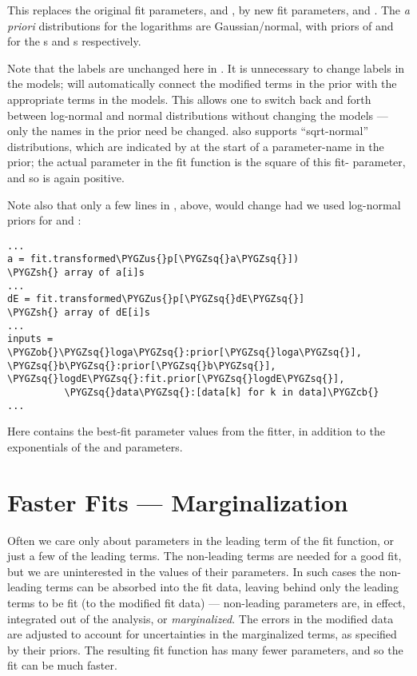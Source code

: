 \documentclass[letterpaper,10pt,english]{sphinxmanual}
\def\PYGZus{\char`\_}
\def\PYGZob{\char`\{}
\def\PYGZcb{\char`\}}
\def\PYGZsh{\char`\#}
\def\PYGZsq{\char`\'}
\begin{document}
This replaces the original fit parameters,  and , by new fit
parameters,  and . The \emph{a priori} distributions for
the logarithms are Gaussian/normal, with priors of  and
 for the s and s respectively.

Note that the labels are unchanged here in . It is
unnecessary to change labels in the models; {\hyperref[corrfitter:corrfitter.CorrFitter]{}} will automatically
connect the  modified terms in the prior with the appropriate terms in the
models. This allows one to switch back and forth between log-normal and normal
distributions without changing the models --- only the names in the prior
need be changed. {\hyperref[corrfitter:corrfitter.CorrFitter]{}} also supports ``sqrt-normal'' distributions,
which are indicated by  at the start of a parameter-name in the
prior; the actual parameter in the fit function is the square of this fit-
parameter, and so is again positive.

Note also that only a few lines in , above,
would change had we used log-normal priors for  and :

\begin{Verbatim}[commandchars=\\\{\}]
...
a = fit.transformed\PYGZus{}p[\PYGZsq{}a\PYGZsq{}])                 \PYGZsh{} array of a[i]s
...
dE = fit.transformed\PYGZus{}p[\PYGZsq{}dE\PYGZsq{}]                \PYGZsh{} array of dE[i]s
...
inputs = \PYGZob{}\PYGZsq{}loga\PYGZsq{}:prior[\PYGZsq{}loga\PYGZsq{}], \PYGZsq{}b\PYGZsq{}:prior[\PYGZsq{}b\PYGZsq{}], \PYGZsq{}logdE\PYGZsq{}:fit.prior[\PYGZsq{}logdE\PYGZsq{}],
          \PYGZsq{}data\PYGZsq{}:[data[k] for k in data]\PYGZcb{}
...
\end{Verbatim}

Here  contains the best-fit parameter values from the
fitter, in addition to the exponentials of the  and 
parameters.


\section{Faster Fits --- Marginalization}
\label{corrfitter:marginalized-fits}\label{corrfitter:faster-fits-marginalization}
Often we care only about parameters in the leading term of the fit function,
or just a few of the leading terms. The non-leading terms are needed for a
good fit, but we are uninterested in the values of their parameters. In such
cases the non-leading terms can be absorbed into the fit data, leaving behind
only the leading terms to be fit (to the modified fit data) --- non-leading
parameters are, in effect, integrated out of the analysis, or \emph{marginalized}.
The errors in the modified data are adjusted to account for uncertainties in
the marginalized terms, as specified by their priors. The resulting fit
function has many fewer parameters, and so the fit can be much faster.
\end{document}
